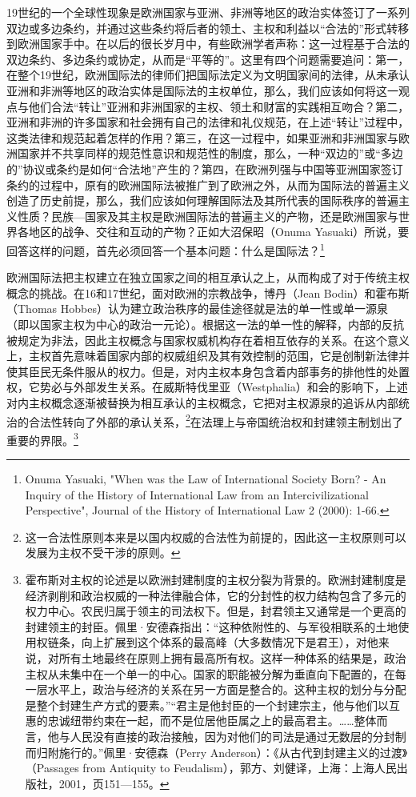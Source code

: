 \documentclass[a4paper, 12pt, openright]{ctexbook}
\begin{document}
19世纪的一个全球性现象是欧洲国家与亚洲、非洲等地区的政治实体签订了一系列双边或多边条约，并通过这些条约将后者的领土、主权和利益以“合法的”形式转移到欧洲国家手中。在以后的很长岁月中，有些欧洲学者声称：这一过程基于合法的双边条约、多边条约或协定，从而是“平等的”。这里有四个问题需要追问：第一，在整个19世纪，欧洲国际法的律师们把国际法定义为文明国家间的法律，从未承认亚洲和非洲等地区的政治实体是国际法的主权单位，那么，我们应该如何将这一观点与他们合法“转让”亚洲和非洲国家的主权、领土和财富的实践相互吻合？第二，亚洲和非洲的许多国家和社会拥有自己的法律和礼仪规范，在上述“转让”过程中，这类法律和规范起着怎样的作用？第三，在这一过程中，如果亚洲和非洲国家与欧洲国家并不共享同样的规范性意识和规范性的制度，那么，一种“双边的”或“多边的”协议或条约是如何“合法地”产生的？第四，在欧洲列强与中国等亚洲国家签订条约的过程中，原有的欧洲国际法被推广到了欧洲之外，从而为国际法的普遍主义创造了历史前提，那么，我们应该如何理解国际法及其所代表的国际秩序的普遍主义性质？民族—国家及其主权是欧洲国际法的普遍主义的产物，还是欧洲国家与世界各地区的战争、交往和互动的产物？正如大沼保昭（Onuma Yasuaki）所说，要回答这样的问题，首先必须回答一个基本问题：什么是国际法？\footnote{Onuma Yasuaki, "When was the Law of International Society Born? - An Inquiry of the History of International Law from an Intercivilizational Perspective", Journal of the History of International Law 2 (2000): 1-66.}

欧洲国际法把主权建立在独立国家之间的相互承认之上，从而构成了对于传统主权概念的挑战。在16和17世纪，面对欧洲的宗教战争，博丹（Jean Bodin）和霍布斯（Thomas Hobbes）认为建立政治秩序的最佳途径就是法的单一性或单一源泉（即以国家主权为中心的政治一元论）。根据这一法的单一性的解释，内部的反抗被规定为非法，因此主权概念与国家权威机构存在着相互依存的关系。在这个意义上，主权首先意味着国家内部的权威组织及其有效控制的范围，它是创制新法律并使其臣民无条件服从的权力。但是，对内主权本身包含着内部事务的排他性的处置权，它势必与外部发生关系。在威斯特伐里亚（Westphalia）和会的影响下，上述对内主权概念逐渐被替换为相互承认的主权概念，它把对主权源泉的追诉从内部统治的合法性转向了外部的承认关系，\footnote{这一合法性原则本来是以国内权威的合法性为前提的，因此这一主权原则可以发展为主权不受干涉的原则。}在法理上与帝国统治权和封建领主制划出了重要的界限。\footnote{霍布斯对主权的论述是以欧洲封建制度的主权分裂为背景的。欧洲封建制度是经济剥削和政治权威的一种法律融合体，它的分封性的权力结构包含了多元的权力中心。农民归属于领主的司法权下。但是，封君领主又通常是一个更高的封建领主的封臣。佩里·安德森指出：“这种依附性的、与军役相联系的土地使用权链条，向上扩展到这个体系的最高峰（大多数情况下是君王），对他来说，对所有土地最终在原则上拥有最高所有权。这样一种体系的结果是，政治主权从未集中在一个单一的中心。国家的职能被分解为垂直向下配置的，在每一层水平上，政治与经济的关系在另一方面是整合的。这种主权的划分与分配是整个封建生产方式的要素。”“君主是他封臣的一个封建宗主，他与他们以互惠的忠诚纽带约束在一起，而不是位居他臣属之上的最高君主。……整体而言，他与人民没有直接的政治接触，因为对他们的司法是通过无数层的分封制而归附施行的。”佩里·安德森（Perry Anderson）：《从古代到封建主义的过渡》（Passages from Antiquity to Feudalism），郭方、刘健译，上海：上海人民出版社，2001，页151—155。}
\end{document}
